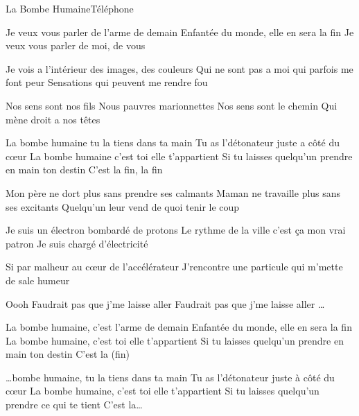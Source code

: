 \begin{Song}{La Bombe Humaine}{Téléphone}
\begin{multicols}{2}

\begin{Verse}
Je veux vous parler de l'arme de demain
Enfantée du monde, elle en sera la fin
Je veux vous parler de moi, de vous
\espaceInterStrophe

Je vois a l'intérieur des images, des couleurs
Qui ne sont pas a moi qui parfois me font peur
Sensations qui peuvent me rendre fou
\end{Verse}
\espaceInterStrophe

\begin{PreChorus}
Nos sens sont nos fils
Nous pauvres marionnettes
Nos sens sont le chemin
Qui mène droit a nos têtes
\end{PreChorus}
\espaceInterStrophe

\begin{Chorus}
La bombe humaine tu la tiens dans ta main
Tu as l'détonateur juste a côté du c\oe ur
La bombe humaine c'est toi elle t'appartient
Si tu laisses quelqu'un prendre en main ton destin
C'est la fin, la fin
\end{Chorus}
\espaceInterStrophe

\begin{Verse}
Mon père ne dort plus sans prendre ses calmants
Maman ne travaille plus sans ses excitants
Quelqu'un leur vend de quoi tenir le coup
\espaceInterStrophe

Je suis un électron bombardé de protons
Le rythme de la ville c'est ça mon vrai patron
Je suis chargé d'électricité
\end{Verse}
\espaceInterStrophe

\begin{PreChorus}
Si par malheur au c\oe ur
de l'accélérateur
J'rencontre une particule
qui m'mette de sale humeur
\end{PreChorus}
\columnbreak

\begin{Chorus}
Oooh
Faudrait pas que j'me laisse aller
Faudrait pas que j'me laisse aller
\dots
\espaceInterStrophe

La bombe humaine, c'est l'arme de demain
Enfantée du monde, elle en sera la fin
La bombe humaine, c'est toi elle t'appartient
Si tu laisses quelqu'un prendre en main ton destin
C'est la (fin)
\espaceInterStrophe

\dots bombe humaine, tu la tiens dans ta main
Tu as l'détonateur juste à côté du c\oe ur
La bombe humaine, c'est toi elle t'appartient
Si tu laisses quelqu'un prendre ce qui te tient
C'est la\dots
\espaceInterStrophe


\end{Chorus}
\end{multicols}
\end{Song}
